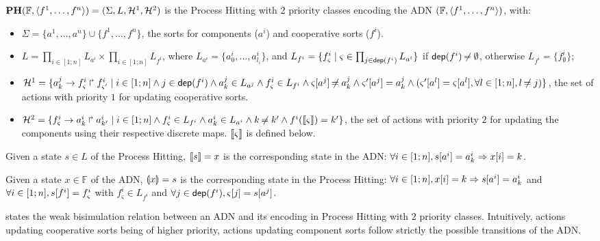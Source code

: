 \begin{definition}
\label{def:DN2PH}
$\mathbf{PH}(\mathbb F, \langle f^1, \dots, f^n\rangle)=(\Sigma,L,\mathcal{H}^1,\mathcal{H}^2)$ is the Process Hitting with 2 priority classes encoding the
ADN $(\mathbb F, \langle f^1, \dots, f^n\rangle)$, with:
\begin{itemize}
\item $\Sigma = \{ a^1, \dots, a^n \} \cup \{ f^1, \dots, f^n \}$,
the sorts for components ($a^i$) and cooperative sorts ($f^i$).

\item $L=\prod_{i\in[1;n]} L_{a^i} \times \prod_{i\in[1;n]} L_{f^i}$, where
$L_{a^i}=\{a^i_0, \dots, a^i_{l_i}\}$, and
$L_{f^i}=\{f^i_\varsigma \mid \varsigma\in\prod_{j\in\mathsf{dep}(f^i)} L_{a^i} \}$
if $\mathsf{dep}(f^i)\not\nobreak\mkern -2mu =\emptyset$, otherwise
$L_{f^i}=\{f^i_\emptyset\}$;
  
\item $\mathcal{H}^1= \{ a^j_k\rightarrow f^i_\varsigma\Rsh f^i_{\varsigma'}
 \mid i\in[1;n] \wedge
j\in\mathsf{dep}(f^i) \wedge a^j_k\in L_{a^j} \wedge f^i_\varsigma\in L_{f^i}
\wedge
\varsigma[{a^j}]\not\nobreak\mkern -2mu = a^j_k 
\wedge \varsigma'[{a^j}]=a^j_k
\wedge (\varsigma'[{a^{l}}]=\varsigma[{a^l}],
\forall l\in[1;n],l\not\nobreak\mkern -2mu = j)
\}$, 
the set of actions with priority $1$ for updating cooperative sorts.

\item $\mathcal{H}^2=\{ f^i_\varsigma\rightarrow a^i_k\Rsh a^i_{k'} \mid i\in[1;n] \wedge
      f^i_\varsigma\in L_{f^i} \wedge
      a^i_k\in L_{a^i}\wedge k\not\nobreak\mkern -2mu = k' \wedge f^i(\llbracket\varsigma\rrbracket) = k'
    \}$,
the set of actions with priority $2$ for updating the components using their respective discrete
maps.
$\llbracket\varsigma\rrbracket$ is defined below.
\end{itemize}
Given a state $s\in L$ of the Process Hitting, 
$\llbracket s\rrbracket=x$ is the corresponding state in the ADN:
$\forall i\in[1;n], s[{a^i}]=a^i_k \Rightarrow x[{i}]=k$.

\noindent
Given a state $x\in \mathbb F$ of the ADN, 
$\llparenthesis x\rrparenthesis=s$ is the corresponding state in the Process Hitting:
$\forall i\in[1;n], x[{i}]=k \Rightarrow s[{a^i}]=a^i_k$
and
$\forall i\in[1;n], s[{f^i}]=f^i_\varsigma$ with $f^i_\varsigma\in L_{f^i}$
and $\forall j\in\mathsf{dep}(f^i), \varsigma[{j}]=s[{a^j}]$.
\end{definition}

 states the weak bisimulation relation between an ADN and its encoding in
Process Hitting with $2$ priority classes.
Intuitively, actions updating cooperative sorts being of higher priority, actions updating component
sorts follow strictly the possible transitions of the ADN.

